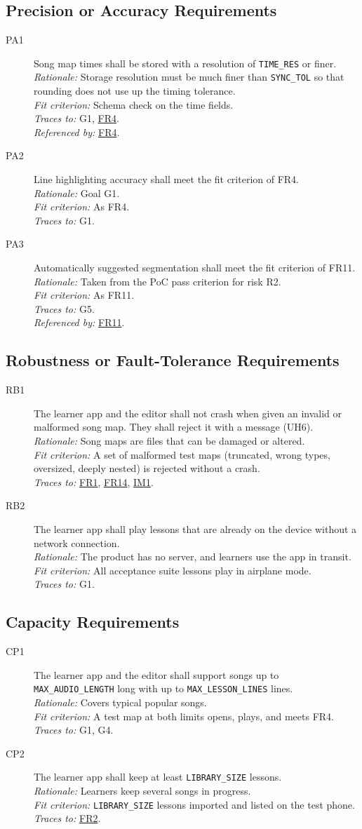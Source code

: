 \documentclass[12pt]{article}
\newcommand{\cn}[1]{\texttt{#1}}
\newcommand{\rat}[1]{\\\textit{Rationale:} #1}
\newcommand{\fit}[1]{\\\textit{Fit criterion:} #1}
\newcommand{\trace}[1]{\\\textit{Traces to:} #1}
\newcommand{\usedby}[1]{\\\textit{Referenced by:} #1}
\newcommand{\reqdef}[1]{\hypertarget{req:#1}{#1}}
\newcommand{\req}[1]{\hyperlink{req:#1}{#1}}
\begin{document}
\subsection{Precision or Accuracy Requirements}
\begin{description}
\item[\reqdef{PA1}] Song map times shall be stored with a resolution of \cn{TIME\_RES}
or finer.
\rat{Storage resolution must be much finer than \cn{SYNC\_TOL} so that
rounding does not use up the timing tolerance.}
\fit{Schema check on the time fields.}
\trace{G1, \req{FR4}.}
\usedby{\req{FR4}.}

\item[\reqdef{PA2}] Line highlighting accuracy shall meet the fit criterion of FR4.
\rat{Goal G1.}
\fit{As FR4.}
\trace{G1.}

\item[\reqdef{PA3}] Automatically suggested segmentation shall meet the fit criterion of
FR11.
\rat{Taken from the PoC pass criterion for risk R2.}
\fit{As FR11.}
\trace{G5.}
\usedby{\req{FR11}.}
\end{description}

\subsection{Robustness or Fault-Tolerance Requirements}
\begin{description}
\item[\reqdef{RB1}] The learner app and the editor shall not crash when given an invalid
or malformed song map. They shall reject it with a message (UH6).
\rat{Song maps are files that can be damaged or altered.}
\fit{A set of malformed test maps (truncated, wrong types, oversized, deeply
nested) is rejected without a crash.}
\trace{\req{FR1}, \req{FR14}, \req{IM1}.}

\item[\reqdef{RB2}] The learner app shall play lessons that are already on the device
without a network connection.
\rat{The product has no server, and learners use the app in transit.}
\fit{All acceptance suite lessons play in airplane mode.}
\trace{G1.}
\end{description}

\subsection{Capacity Requirements}
\begin{description}
\item[\reqdef{CP1}] The learner app and the editor shall support songs up to
\cn{MAX\_AUDIO\_LENGTH} long with up to \cn{MAX\_LESSON\_LINES} lines.
\rat{Covers typical popular songs.}
\fit{A test map at both limits opens, plays, and meets FR4.}
\trace{G1, G4.}

\item[\reqdef{CP2}] The learner app shall keep at least \cn{LIBRARY\_SIZE} lessons.
\rat{Learners keep several songs in progress.}
\fit{\cn{LIBRARY\_SIZE} lessons imported and listed on the test phone.}
\trace{\req{FR2}.}
\end{description}
\end{document}
